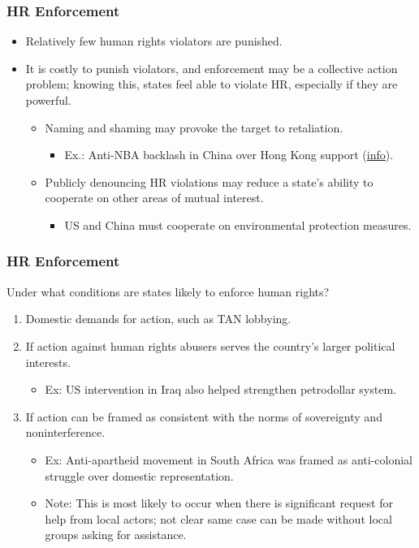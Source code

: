 \documentclass[handout]{beamer}
\begin{document}
\begin{frame} 
	\frametitle{\LARGE{HR Enforcement}}
	\begin{itemize}
		\item Relatively few human rights violators are punished. \pause
		\item It is costly to punish violators, and enforcement may be a collective action problem; knowing this, states feel able to violate HR, especially if they are powerful. \pause
		\begin{itemize}
			\item Naming and shaming may provoke the target to retaliation. \pause
			\begin{itemize}
				\item Ex.:  Anti-NBA backlash in China over Hong Kong support (\href{https://www.businessinsider.com/nba-china-feud-timeline-daryl-morey-tweet-hong-kong-protests-2019-10}{info}).
				
			\end{itemize}
			\item Publicly denouncing HR violations may reduce a state's ability to cooperate on other areas of mutual interest. \pause
			\begin{itemize}
				\item US and China must cooperate on environmental protection measures.
			\end{itemize}
		\end{itemize}
	\end{itemize}
\end{frame}

\begin{frame} 
	\frametitle{\LARGE{HR Enforcement}}
	Under what conditions are states likely to enforce human rights?
	\begin{enumerate}
		\item Domestic demands for action, such as TAN lobbying. \pause
		\item If action against human rights abusers serves the country’s larger political interests. \pause
		\begin{itemize}
			\item Ex: US intervention in Iraq also helped strengthen petrodollar system. \pause
		\end{itemize}
		\item If action can be framed as consistent with the norms of sovereignty and noninterference. \pause 
		\begin{itemize}
			\item Ex: Anti-apartheid movement in South Africa was framed as anti-colonial struggle over domestic representation.
			\item Note: This is most likely to occur when there is significant request for help from local actors; not clear same case can be made without local groups asking for assistance.
			
		\end{itemize}
		
		
	\end{enumerate}
\end{frame}
\end{document}
